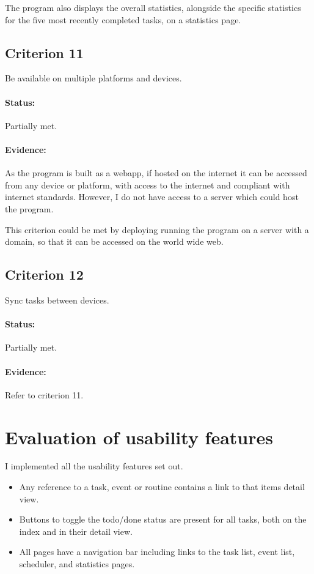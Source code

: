 \documentclass{article}
\begin{document}
The program also displays the overall statistics,
alongside the specific statistics for the five most recently completed tasks,
on a statistics page.

\subsection*{Criterion 11}
Be available on multiple platforms and devices.

\paragraph{Status:}
Partially met.

\paragraph{Evidence:}
As the program is built as a webapp,
if hosted on the internet it can be accessed from any device or platform,
with access to the internet and compliant with internet standards.
However, I do not have access to a server which could host the program.

This criterion could be met by deploying running the program on a server with a domain,
so that it can be accessed on the world wide web.

\subsection*{Criterion 12}
Sync tasks between devices.

\paragraph{Status:}
Partially met.

\paragraph{Evidence:}
Refer to criterion 11.

\section{Evaluation of usability features}
I implemented all the usability features set out.
\begin{samepage}
	\begin{itemize}
		\item Any reference to a task, event or routine contains a link to that items detail view.
		\item Buttons to toggle the todo/done status are present for all tasks,
		      both on the index and in their detail view.
		\item All pages have a navigation bar including links to the task list,
		      event list,
		      scheduler,
		      and statistics pages.
	\end{itemize}
\end{samepage}
\end{document}
